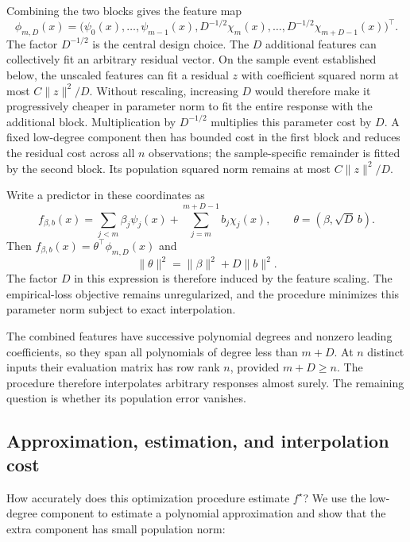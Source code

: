 \documentclass[11pt,twoside]{article}
\theoremstyle{definition}
\theoremstyle{remark}
\begin{document}
Combining the two blocks gives the feature map
\begin{equation}
 \phi_{m,D}(x)=
 \bigl(\psi_0(x),\ldots,\psi_{m-1}(x),
 D^{-1/2}\chi_m(x),\ldots,D^{-1/2}\chi_{m+D-1}(x)\bigr)^\top.
 \label{eq:scaled-feature-map}
\end{equation}
The factor $D^{-1/2}$ is the central design choice. The $D$ additional
features can collectively fit an arbitrary residual vector. On the sample
event established below, the unscaled features can fit a residual $z$ with
coefficient squared norm at most $C\|z\|^2/D$. Without rescaling, increasing
$D$ would therefore make it progressively cheaper in parameter norm to fit
the entire response with the additional block. Multiplication by
$D^{-1/2}$ multiplies this parameter cost by $D$. A fixed low-degree
component then has bounded cost in the first block and reduces the residual
cost across all $n$ observations; the sample-specific remainder is fitted by
the second block. Its population squared norm remains at most
$C\|z\|^2/D$.

Write a predictor in these coordinates as
\[
 f_{\beta,b}(x)=\sum_{j<m}\beta_j\psi_j(x)
             +\sum_{j=m}^{m+D-1}b_j\chi_j(x),
 \qquad \theta=(\beta,\sqrt D\,b).
\]
Then $f_{\beta,b}(x)=\theta^\top\phi_{m,D}(x)$ and
\begin{equation}
 \|\theta\|^2=\|\beta\|^2+D\|b\|^2.
 \label{eq:weighted-series-norm}
\end{equation}
The factor $D$ in this expression is therefore induced by the feature
scaling. The empirical-loss objective remains unregularized, and the
procedure minimizes this parameter norm subject to exact interpolation.

The combined features have successive polynomial degrees and nonzero leading
coefficients, so they span all polynomials of degree less than $m+D$. At $n$
distinct inputs their evaluation matrix has row rank $n$, provided $m+D\ge n$.
The procedure
therefore interpolates arbitrary responses almost surely. The remaining
question is whether its population error vanishes.

\subsection{Approximation, estimation, and interpolation cost}

How accurately does this optimization procedure estimate $f^\star$?
We use the low-degree component to estimate a polynomial approximation and
show that the extra component has small population norm:
\end{document}

